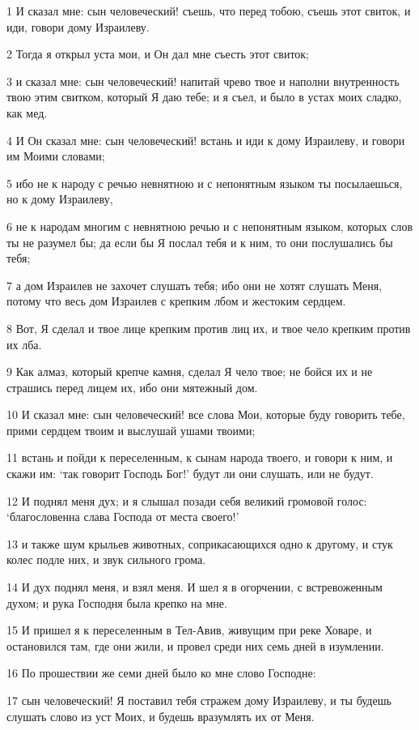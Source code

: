 \par 1 И сказал мне: сын человеческий! съешь, что перед тобою, съешь этот свиток, и иди, говори дому Израилеву.
\par 2 Тогда я открыл уста мои, и Он дал мне съесть этот свиток;
\par 3 и сказал мне: сын человеческий! напитай чрево твое и наполни внутренность твою этим свитком, который Я даю тебе; и я съел, и было в устах моих сладко, как мед.
\par 4 И Он сказал мне: сын человеческий! встань и иди к дому Израилеву, и говори им Моими словами;
\par 5 ибо не к народу с речью невнятною и с непонятным языком ты посылаешься, но к дому Израилеву,
\par 6 не к народам многим с невнятною речью и с непонятным языком, которых слов ты не разумел бы; да если бы Я послал тебя и к ним, то они послушались бы тебя;
\par 7 а дом Израилев не захочет слушать тебя; ибо они не хотят слушать Меня, потому что весь дом Израилев с крепким лбом и жестоким сердцем.
\par 8 Вот, Я сделал и твое лице крепким против лиц их, и твое чело крепким против их лба.
\par 9 Как алмаз, который крепче камня, сделал Я чело твое; не бойся их и не страшись перед лицем их, ибо они мятежный дом.
\par 10 И сказал мне: сын человеческий! все слова Мои, которые буду говорить тебе, прими сердцем твоим и выслушай ушами твоими;
\par 11 встань и пойди к переселенным, к сынам народа твоего, и говори к ним, и скажи им: `так говорит Господь Бог!' будут ли они слушать, или не будут.
\par 12 И поднял меня дух; и я слышал позади себя великий громовой голос: `благословенна слава Господа от места своего!'
\par 13 и также шум крыльев животных, соприкасающихся одно к другому, и стук колес подле них, и звук сильного грома.
\par 14 И дух поднял меня, и взял меня. И шел я в огорчении, с встревоженным духом; и рука Господня была крепко на мне.
\par 15 И пришел я к переселенным в Тел-Авив, живущим при реке Ховаре, и остановился там, где они жили, и провел среди них семь дней в изумлении.
\par 16 По прошествии же семи дней было ко мне слово Господне:
\par 17 сын человеческий! Я поставил тебя стражем дому Израилеву, и ты будешь слушать слово из уст Моих, и будешь вразумлять их от Меня.
